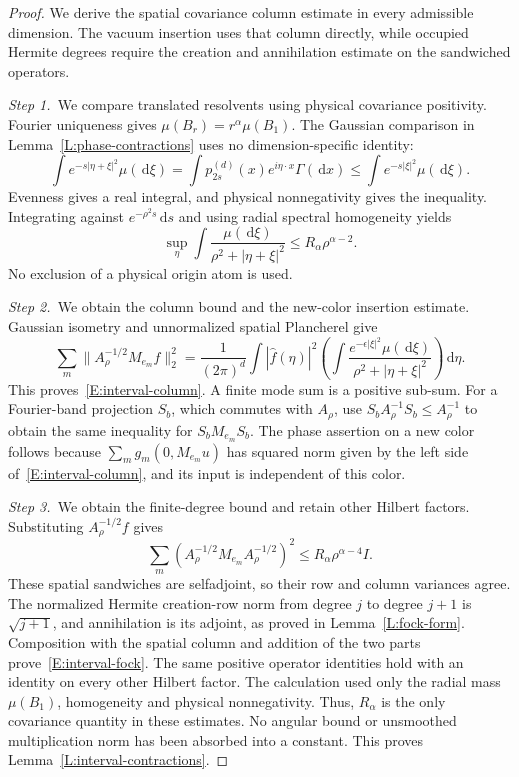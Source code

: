 \documentclass[12pt,oneside,openany]{book}
\numberwithin{equation}{section}
\theoremstyle{nogostyle}
\theoremstyle{definition}
\newcommand{\ud}{\,\mathrm{d}}
\begin{document}
\begin{proof}
  We derive the spatial covariance column estimate in every admissible
  dimension. The vacuum insertion uses that column directly, while occupied
  Hermite degrees require the creation and annihilation estimate on the
  sandwiched operators.


  \medskip
  \noindent\textit{Step 1.~}We compare translated resolvents using physical
  covariance positivity.
  Fourier uniqueness gives $\mu(B_r) = r^\alpha\mu(B_1)$. The Gaussian
  comparison in Lemma~\ref{L:phase-contractions} uses no dimension-specific
  identity:
  \[
    \int e^{-s|\eta+\xi|^2}\mu(\ud\xi)
    =\int p_{2s}^{(d)}(x)e^{i\eta\cdot x}\Gamma(\ud x)
    \le\int e^{-s|\xi|^2}\mu(\ud\xi).
  \]
  Evenness gives a real integral, and physical nonnegativity gives the
  inequality. Integrating against $e^{-\rho^2s}\ud s$ and using radial spectral
  homogeneity yields
  \[
    \sup_\eta\int\frac{\mu(\ud\xi)}{\rho^2+|\eta+\xi|^2}
    \le R_\alpha\rho^{\alpha-2}.
  \]
  No exclusion of a physical origin atom is used.


  \medskip
  \noindent\textit{Step 2.~}We obtain the column bound and the new-color
  insertion estimate.
  Gaussian isometry and unnormalized spatial Plancherel give
  \[
    \sum_m\|A_\rho^{-1/2}M_{e_m}f\|_2^2
    =\frac1{(2\pi)^d}\int|\widehat{f}(\eta)|^2
    \left(\int\frac{e^{-\epsilon|\xi|^2}\mu(\ud\xi)}
    {\rho^2+|\eta+\xi|^2}\right)\ud\eta .
  \]
  This proves~\eqref{E:interval-column}. A finite mode sum is a positive
  sub-sum. For a Fourier-band projection $S_b$, which commutes with $A_\rho$,
  use $S_bA_\rho^{-1}S_b \le A_\rho^{-1}$ to obtain the same inequality for
  $S_bM_{e_m}S_b$. The phase assertion on a new color follows because
  $\sum_mg_m(0,M_{e_m}u)$ has squared norm given by the left side
  of~\eqref{E:interval-column}, and its input is independent of this color.


  \medskip
  \noindent\textit{Step 3.~}We obtain the finite-degree bound and retain other
  Hilbert factors.
  Substituting $A_\rho^{-1/2}f$ gives
  \[
    \sum_m(A_\rho^{-1/2}M_{e_m}A_\rho^{-1/2})^2
    \le R_\alpha\rho^{\alpha-4}I.
  \]
  These spatial sandwiches are selfadjoint, so their row and column variances
  agree. The normalized Hermite creation-row norm from degree $j$ to degree
  $j+1$ is $\sqrt{j+1}$, and annihilation is its adjoint, as proved in
  Lemma~\ref{L:fock-form}. Composition with the spatial column and addition of
  the two parts prove~\eqref{E:interval-fock}. The same positive operator
  identities hold with an identity on every other Hilbert factor. The
  calculation used only the radial mass $\mu(B_1)$, homogeneity and physical
  nonnegativity. Thus, $R_\alpha$ is the only covariance quantity in these
  estimates. No angular bound or unsmoothed multiplication norm has been
  absorbed into a constant. This proves Lemma~\ref{L:interval-contractions}.
\end{proof}
\end{document}
